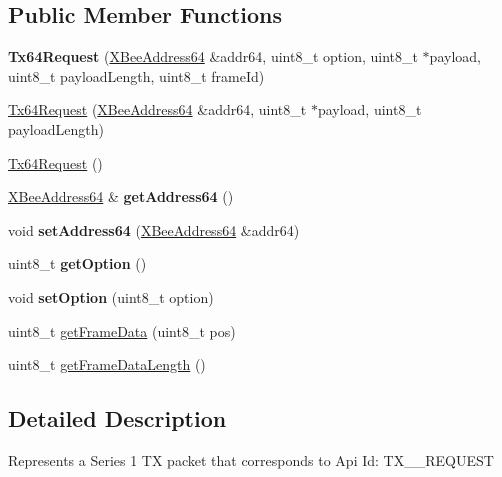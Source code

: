 \subsection*{\-Public \-Member \-Functions}
\begin{DoxyCompactItemize}
\item 
\hypertarget{classTx64Request_a7670fd44d8765d8215a3e5cfcf605c1e}{{\bfseries \-Tx64\-Request} (\hyperlink{classXBeeAddress64}{\-X\-Bee\-Address64} \&addr64, uint8\-\_\-t option, uint8\-\_\-t $\ast$payload, uint8\-\_\-t payload\-Length, uint8\-\_\-t frame\-Id)}\label{classTx64Request_a7670fd44d8765d8215a3e5cfcf605c1e}

\item 
\hyperlink{classTx64Request_a7c9d830fa804daaf39ed368894cf9691}{\-Tx64\-Request} (\hyperlink{classXBeeAddress64}{\-X\-Bee\-Address64} \&addr64, uint8\-\_\-t $\ast$payload, uint8\-\_\-t payload\-Length)
\item 
\hyperlink{classTx64Request_a49bd84b4aa5478c27e6da5581b2e1d3c}{\-Tx64\-Request} ()
\item 
\hypertarget{classTx64Request_a8f6970aa54b8504be65e05ce1f52e8e4}{\hyperlink{classXBeeAddress64}{\-X\-Bee\-Address64} \& {\bfseries get\-Address64} ()}\label{classTx64Request_a8f6970aa54b8504be65e05ce1f52e8e4}

\item 
\hypertarget{classTx64Request_a863a993ad01c08b5c9835e9d7288bedd}{void {\bfseries set\-Address64} (\hyperlink{classXBeeAddress64}{\-X\-Bee\-Address64} \&addr64)}\label{classTx64Request_a863a993ad01c08b5c9835e9d7288bedd}

\item 
\hypertarget{classTx64Request_aac90589d46191868f19713aea49a421f}{uint8\-\_\-t {\bfseries get\-Option} ()}\label{classTx64Request_aac90589d46191868f19713aea49a421f}

\item 
\hypertarget{classTx64Request_a7f6987e3910d97dd8f77f58184dc17c9}{void {\bfseries set\-Option} (uint8\-\_\-t option)}\label{classTx64Request_a7f6987e3910d97dd8f77f58184dc17c9}

\item 
uint8\-\_\-t \hyperlink{classTx64Request_afe3662433da85acd21f8a3d90844a084}{get\-Frame\-Data} (uint8\-\_\-t pos)
\item 
uint8\-\_\-t \hyperlink{classTx64Request_afadc1e07718a62d6c5a75a4bb07dfaae}{get\-Frame\-Data\-Length} ()
\end{DoxyCompactItemize}


\subsection{\-Detailed \-Description}
\-Represents a \-Series 1 \-T\-X packet that corresponds to \-Api \-Id\-: \-T\-X\-\_\-\_\-\-R\-E\-Q\-U\-E\-S\-T


